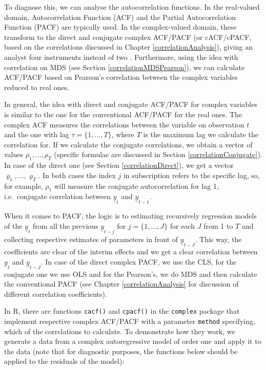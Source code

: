 \documentclass[
]{book}
\begin{document}
To diagnose this, we can analyse the autocorrelation functions. In the real-valued domain, Autocorrelation Function (ACF) and the Partial Autocorrelation Function (PACF) are typically used. In the complex-valued domain, these transform to the direct and conjugate complex ACF/PACF (or cACF/cPACF, based on the correlations discussed in Chapter \ref{correlationAnalysis}), giving an analyst four instruments instead of two \citep{Yao2010, Yao2011, Zhang2022}. Furthermore, using the idea with correlation on MDS (see Section \ref{correlationMDSPearson}), we can calculate ACF/PACF based on Pearson's correlation between the complex variables reduced to real ones.

In general, the idea with direct and conjugate ACF/PACF for complex variables is similar to the one for the conventional ACF/PACF for the real ones. The complex ACF measures the correlations between the variable on observation \(t\) and the one with lag \(\tau=\{1, \dots, T\}\), where \(T\) is the maximum lag we calculate the correlation for. If we calculate the conjugate correlations, we obtain a vector of values \(\rho_{1}, \dots, \rho_{T}\) (specific formulae are discussed in Section \ref{correlationConjugate}). In case of the direct one (see Section \ref{correlationDirect}), we get a vector \(\varrho_{1}, \dots, \varrho_{T}\). In both cases the index \(j\) in subscription refers to the specific lag, so, for example, \(\rho_{1}\) will measure the conjugate autocorrelation for lag 1, i.e.~conjugate correlation between \(\underline{y}_{t}\) and \(\underline{y}_{t-1}\).

When it comes to PACF, the logic is to estimating recursively regression models of the \(\underline{y}_{t}\) from all the previous \(\underline{y}_{t-j}\) for \(j=\{1, \dots, J\}\) for each \(J\) from 1 to \(T\) and collecting respective estimates of parameters in front of \(\underline{y}_{t-J}\). This way, the coefficients are clear of the interim effects and we get a clear correlation between \(\underline{y}_{t}\) and \(\underline{y}_{t-J}\). In case of the direct complex PACF, we use the CLS, for the conjugate one we use OLS and for the Pearson's, we do MDS and then calculate the conventional PACF (see Chapter \ref{correlationAnalysis} for discussion of different correlation coefficients).

In R, there are functions \texttt{cacf()} and \texttt{cpacf()} in the \texttt{complex} package that implement respective complex ACF/PACF with a parameter \texttt{method} specifying, which of the correlations to calculate. To demonstrate how they work, we generate a data from a complex autoregressive model of order one and apply it to the data (note that for diagnostic purposes, the functions below should be applied to the residuals of the model):
\end{document}
